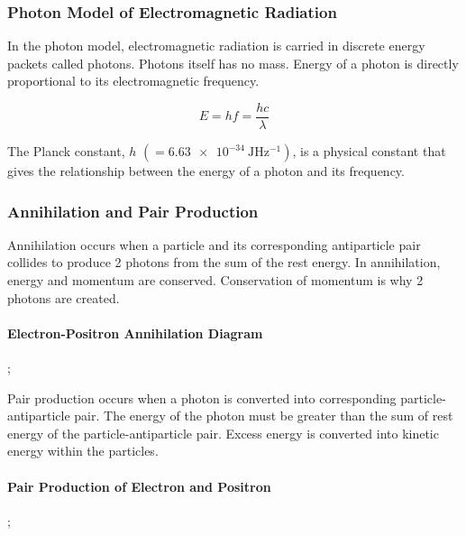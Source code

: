 \documentclass[10pt]{article}
\begin{document}
\begin{multicols}{2}
	\subsubsection{Photon Model of Electromagnetic Radiation}
	In the photon model, electromagnetic radiation is carried in discrete energy
	packets called photons. Photons itself has no mass. Energy of a photon is
	directly proportional to its electromagnetic frequency.

	\begin{equation}
		E = hf = \dfrac{hc}{\lambda}
	\end{equation}

	The Planck constant, $h$ $(= \qty{6.63e-34}{\joule\hertz^{-1}})$, is a physical
	constant that gives the relationship between the energy of a photon and its
	frequency.

	\subsubsection{Annihilation and Pair Production}
	Annihilation occurs when a particle and its corresponding antiparticle pair
	collides to produce 2 photons from the sum of the rest energy. In annihilation,
	energy and momentum are conserved. Conservation of momentum is why 2 photons are
	created.
	\paragraph{Electron-Positron Annihilation Diagram}
	\begin{center}
		;
	\end{center}

	Pair production occurs when a photon is converted into corresponding
	particle-antiparticle pair. The energy of the photon must be greater than the
	sum of rest energy of the particle-antiparticle pair. Excess energy is converted
	into kinetic energy within the particles.
	\paragraph{Pair Production of Electron and Positron}
	\begin{center}
		;
	\end{center}


\end{multicols}
\end{document}
